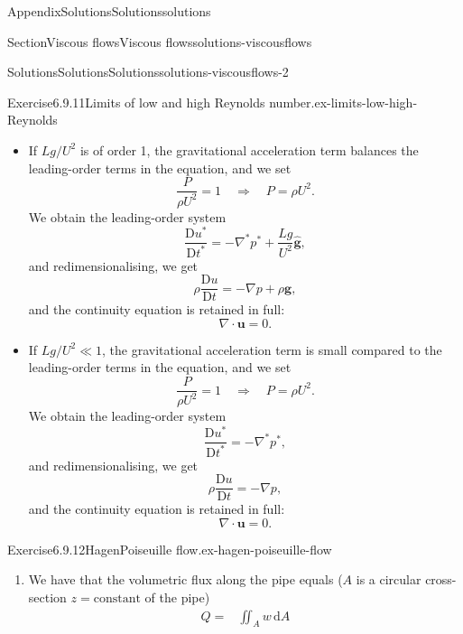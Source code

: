 \documentclass[oneside,10pt,]{book}
\newcommand{\ptxlistdisc}{\raisebox{0.3ex}{\textbullet}}
\numberwithin{equation}{section}
\newcommand{\de}{\mathrm{d}}
\newcommand{\DD}[2]{\frac{\mathrm{D}#1}{\mathrm{D}#2}}
\newcommand{\bu}{\boldsymbol{u}}
\newcommand{\bg}{\boldsymbol{g}}
\begin{document}
\begin{appendixptx}{Appendix}{Solutions}{}{Solutions}{}{}{solutions}
\begin{sectionptx}{Section}{Viscous flows}{}{Viscous flows}{}{}{solutions-viscousflows}
\begin{solutions-subsection-numberless}{Solutions}{Solutions}{}{Solutions}{}{}{solutions-viscousflows-2}
\begin{divisionsolution}{Exercise}{6.9.11}{Limits of low and high Reynolds number.}{ex-limits-low-high-Reynolds}
\begin{enumerate}[font=\bfseries,label=(\alph*),ref=\alph*]
\begin{itemize}[label=\ptxlistdisc]
\begin{equation*}
0=-\nabla p+\rho\bg.
\end{equation*}
%
\item{}If \(Lg/U^2\) is of order 1, the gravitational acceleration term balances the leading-order terms in the equation, and we set%
\begin{equation*}
\frac{P}{\rho U^2}=1\quad\Rightarrow\quad P=\rho U^2.
\end{equation*}
We obtain the leading-order system%
\begin{equation*}
\DD{u^*}{t^*}=-\nabla^* p^*+\frac{Lg}{U^2}\hat{\bg},
\end{equation*}
and redimensionalising, we get%
\begin{equation*}
\rho\DD{u}{t}=-\nabla p+\rho\bg,
\end{equation*}
and the continuity equation is retained in full:%
\begin{equation*}
\nabla\cdot\bu=0.
\end{equation*}
%
\item{}If \(Lg/U^2\ll1\), the gravitational acceleration term is small compared to the leading-order terms in the equation, and we set%
\begin{equation*}
\frac{P}{\rho U^2}=1\quad\Rightarrow\quad P=\rho U^2.
\end{equation*}
We obtain the leading-order system%
\begin{equation*}
\DD{u^*}{t^*}=-\nabla^* p^*,
\end{equation*}
and redimensionalising, we get%
\begin{equation*}
\rho\DD{u}{t}=-\nabla p,
\end{equation*}
and the continuity equation is retained in full:%
\begin{equation*}
\nabla\cdot\bu=0.
\end{equation*}
%
\end{itemize}
%
\end{enumerate}%
\end{divisionsolution}%
\begin{divisionsolution}{Exercise}{6.9.12}{Hagen\textendash{}Poiseuille flow.}{ex-hagen-poiseuille-flow}%
\begin{enumerate}[font=\bfseries,label=(\alph*),ref=\alph*]%
\item[(a)]\noindent\hypertarget{ex-hagen-poiseuille-flow-3-2-main}{}We have that the volumetric flux along the pipe equals (\(A\) is a circular cross-section \(z=\mathrm{constant}\) of the pipe)%
\begin{align*}
Q=&\iint_Aw\,\de A\\

\end{align*}
\end{enumerate}
\end{divisionsolution}
\end{solutions-subsection-numberless}
\end{sectionptx}
\end{appendixptx}
\end{document}

